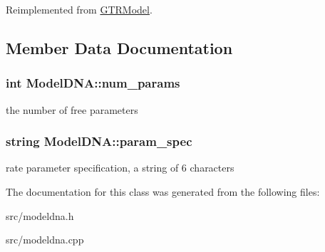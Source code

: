 Reimplemented from \hyperlink{classGTRModel_a3dd6bc6cb405e76346eac7b813687a20}{GTRModel}.

\subsection{Member Data Documentation}
\hypertarget{classModelDNA_acb20f55e922b675d5eb110907fe97ea6}{
\subsubsection[{num\_\-params}]{\setlength{\rightskip}{0pt plus 5cm}int {\bf ModelDNA::num\_\-params}}}
\label{classModelDNA_acb20f55e922b675d5eb110907fe97ea6}
the number of free parameters \hypertarget{classModelDNA_a519992726b2a06ec784c036aef64e749}{
\subsubsection[{param\_\-spec}]{\setlength{\rightskip}{0pt plus 5cm}string {\bf ModelDNA::param\_\-spec}}}
\label{classModelDNA_a519992726b2a06ec784c036aef64e749}
rate parameter specification, a string of 6 characters 

The documentation for this class was generated from the following files:\begin{DoxyCompactItemize}
\item 
src/modeldna.h\item 
src/modeldna.cpp\end{DoxyCompactItemize}
